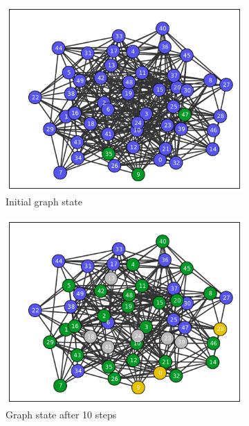 \documentclass[11pt]{article} %
\begin{document}
\begin{figure}[tb]
  \begin{subfigure}[b]{0.5\textwidth}
    \centering
    \includegraphics[width=\textwidth]{figures/evo_ER_50_03_init}
    \caption{Initial graph state}
  \end{subfigure}
  \begin{subfigure}[b]{0.5\textwidth}
    \centering
    \includegraphics[width=\textwidth]{figures/evo_ER_50_03_10}
    \caption{Graph state after 10 steps}
  \end{subfigure}
  \begin{subfigure}[b]{0.5\textwidth}
    \centering

\end{subfigure}
\end{figure}
\end{document}
